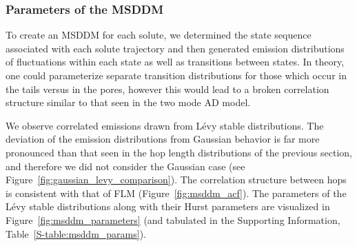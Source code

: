 \documentclass[aps,pre,preprint,groupedaddress]{revtex4-2}
\begin{document}
  \subsubsection{Parameters of the MSDDM}\label{section:msddm_parameterization}

  To create an MSDDM for each solute, we determined the state sequence associated
  with each solute trajectory and then generated emission distributions of fluctuations
  within each state as well as transitions between states. In theory, one could 
  parameterize separate transition distributions for those which occur in the tails 
  versus in the pores, however this would lead to a broken correlation structure 
  similar to that seen in the two mode AD model.

  We observe correlated emissions drawn from L\'evy stable distributions. The 
  deviation of the emission distributions from Gaussian behavior is far more pronounced
  than that seen in the hop length distributions of the previous section, and therefore we 
  did not consider the Gaussian case (see Figure~\ref{fig:gaussian_levy_comparison}).
  The correlation structure between hops is consistent with that of FLM (Figure~\ref{fig:msddm_acf}).
  The parameters of the L\'evy stable distributions along with their Hurst parameters 
  are visualized in Figure~\ref{fig:msddm_parameters} (and tabulated in the Supporting
  Information, Table~\ref{S-table:msddm_params}). 
  
\end{document}
